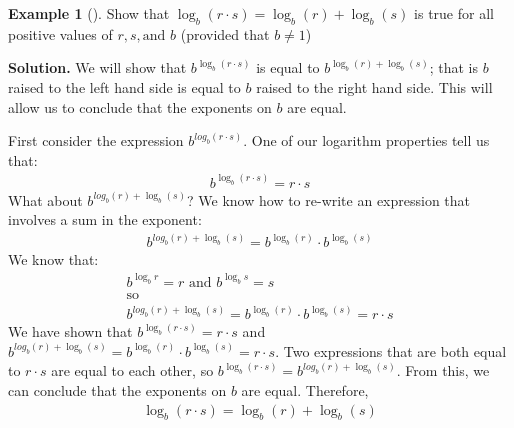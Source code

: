 \documentclass[10pt,]{book}
\theoremstyle{plain}
\theoremstyle{definition}
\theoremstyle{definition}
\newtheorem{example}[theorem]{Example}
\theoremstyle{definition}
\numberwithin{equation}{section}
\begin{document}
\begin{example}[]\label{example-21}
\hypertarget{p-289}{}%
Show that \(\log_b \left( r \cdot s \right) = \log_b \left( r \right) + \log_b \left( s \right) \) is true for all positive values of \(r, s, \text{and } b\) (provided that \(b \neq 1\))%
\par\smallskip%
\noindent\textbf{Solution.}\hypertarget{solution-21}{}\quad%
\hypertarget{p-290}{}%
We will show that \(b^{\log_b\left( r \cdot s \right)}\) is equal to \(b^{ \log_b\left( r \right) + \log_b\left( s \right)}\); that is \(b\) raised to the left hand side is equal to \(b\) raised to the right hand side. This will allow us to conclude that the exponents on \(b\) are equal.%
\par
\hypertarget{p-291}{}%
First consider the expression \(b^{log_b \left( r \cdot s \right)}\). One of our logarithm properties tell us that:%
\begin{gather*}
b^{\log_b \left( r \cdot s \right)} = r \cdot s
\end{gather*}
What about \(b^{log_b \left( r \right) + \log_b \left( s \right)}\)? We know how to re-write an expression that involves a sum in the exponent:%
\begin{gather*}
b^{log_b \left( r \right) + \log_b \left( s \right)} = b^{ \log_b\left( r \right)} \cdot  b^{\log_b\left( s \right)}
\end{gather*}
We know that:%
\begin{gather*}
b^{\log_b r} = r \text{  and  } b^{\log_b s} = s\\
\text{so}\\
b^{log_b \left( r \right) + \log_b \left( s \right)} = b^{ \log_b\left( r \right)} \cdot  b^{\log_b\left( s \right)} = r \cdot s
\end{gather*}
We have shown that \(b^{\log_b \left( r \cdot s \right)} = r \cdot s\) and \(b^{log_b \left( r \right) + \log_b \left( s \right)} = b^{ \log_b\left( r \right)} \cdot  b^{\log_b\left( s \right)} = r \cdot s\). Two expressions that are both equal to \(r \cdot s\) are equal to each other, so \(b^{\log_b \left( r \cdot s \right)} = b^{log_b \left( r \right) + \log_b \left( s \right)}\). From this, we can conclude that the exponents on \(b\) are equal. Therefore,%
\begin{gather*}
\log_b \left( r \cdot s \right) = \log_b \left( r \right) + \log_b \left( s \right)
\end{gather*}
%
\end{example}
\end{document}
